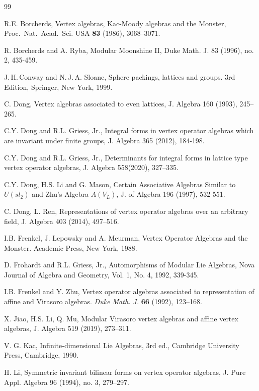 \documentclass[12pt]{article}
\begin{document}
\begin{thebibliography}{99}



 R.E. Borcherds, Vertex algebras, Kac-Moody algebras and the Monster,
  {Proc.\ Nat.\ Acad.\ Sci. USA} {\bf 83} (1986), 3068--3071.

  R. Borcherds and A. Ryba, Modular Moonshine II,  Duke Math. J. 83 (1996), no. 2, 435-459.


  J.\,H.\,Conway and N.\,J.\,A. Sloane, Sphere packings, lattices and
  groups. 3rd Edition, Springer, New York, 1999.
  
 C. Dong, Vertex algebras associated to even lattices, J. Algebra 160 (1993), 
245--265.

  C.Y. Dong  and R.L.  Griess, Jr.,  Integral forms in vertex operator algebras which are invariant under finite groups,  J. Algebra 365 (2012), 184-198.

 

 C.Y. Dong  and R.L.  Griess, Jr., 
Determinants for integral forms in lattice type vertex operator algebras, 
J. Algebra 558(2020), 327--335. 



 C.Y. Dong, H.S. Li and G. Mason, Certain Associative Algebras Similar to $U(sl_2)$ and Zhu's Algebra $A(V_L)$, J. of Algebra 196 (1997), 532-551. 


 C. Dong, L. Ren, Representations of vertex operator algebras over an arbitrary field, J. Algebra 403
(2014), 497--516.

  I.B. Frenkel, J. Lepowsky and A. Meurman, Vertex Operator Algebras
  and the Monster. Academic Press, New York, 1988.


D. Frohardt and R.L. Griess, Jr., Automorphisms of Modular Lie Algebras, Nova Journal of Algebra and Geometry, Vol. 1, No. 4, 1992, 339-345.

  I.B. Frenkel and Y. Zhu, Vertex operator algebras associated to
  representation of affine and Virasoro algebras. {\it Duke Math. J.}
  {\bf 66} (1992), 123--168.

 X. Jiao, H.S. Li, Q. Mu, Modular Virasoro vertex algebras and affine vertex
algebras, J. Algebra 519 (2019), 273--311.

V. G. Kac, Infinite-dimensional Lie Algebras, 3rd ed., Cambridge University Press, Cambridge, 1990.

  H. Li, Symmetric invariant bilinear forms on vertex operator algebras, 
J. Pure Appl. Algebra 96 (1994), no. 3, 279--297.


\end{thebibliography}
\end{document}

